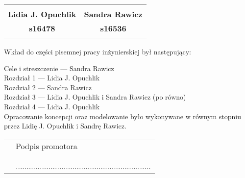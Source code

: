 \documentclass[12pt]{article}
\begin{document}
\begin{center}
	\begin{tabular}{c c}
		\hline
		\\
		\textbf{Lidia J. Opuchlik} \qquad 	& \qquad \qquad
		\textbf{Sandra Rawicz}	\\
		
		\textbf{s16478}&\qquad \qquad \textbf{s16536 }\\
		& \\
		\hline
	\end{tabular}
\end{center}



\noindent Wkład do części pisemnej pracy inżynierskiej był następujący:

\bigskip
\noindent Cele i streszczenie --- Sandra Rawicz \\
Rozdział 1 --- Lidia J. Opuchlik \\
Rozdział 2 --- Sandra Rawicz \\
Rozdział 3 --- Lidia J. Opuchlik i Sandra Rawicz (po równo) \\
Rozdział 4 --- Lidia J. Opuchlik \\


\bigskip
\noindent Opracowanie koncepcji oraz modelowanie było wykonywane w równym stopniu przez Lidię J. Opuchlik i Sandrę Rawicz.

\bigskip\bigskip\bigskip

\begin{tabular}{p{7cm} p{5cm}}

	 & 
	 	Podpis promotora
	 \\
		& \\
		& \\
     & .............................................................. \\

\end{tabular}
\end{document}
